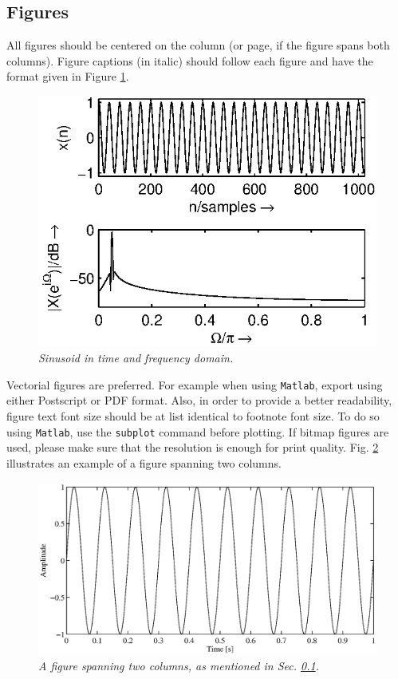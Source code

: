 \documentclass[twoside,a4paper]{article}
\begin{document}
\subsection{Figures}
\label{ssec:figures}
All figures should be centered on the column (or page, if the figure
spans both columns).  Figure captions (in italic) should follow each
figure and have the format given in Figure \ref{fft_plot}.
\begin{figure}[ht]
\centerline{\includegraphics[scale=0.8]{fft_plot2.eps}}
\caption{\label{fft_plot}{\it Sinusoid in time and frequency domain.}}
\end{figure}
Vectorial figures are preferred. For example when using
\texttt{Matlab}, export using either Postscript or PDF format. Also,
in order to provide a better readability, figure text font size should
be at list identical to footnote font size. To do so using
\texttt{Matlab}, use the \texttt{subplot} command before plotting.  If
bitmap figures are used, please make sure that the resolution is
enough for print quality. Fig. \ref{ftt_plot2} illustrates an example
of a figure spanning two columns.
\begin{figure}[ht]
\center
\includegraphics[width=5in,bb = 3 257 607 534]{TwoColumnSine2.eps} %
\caption{\label{ftt_plot2}{\it A figure spanning two columns, as mentioned in Sec. \ref{ssec:figures}. }}
\end{figure} 
\end{document}
